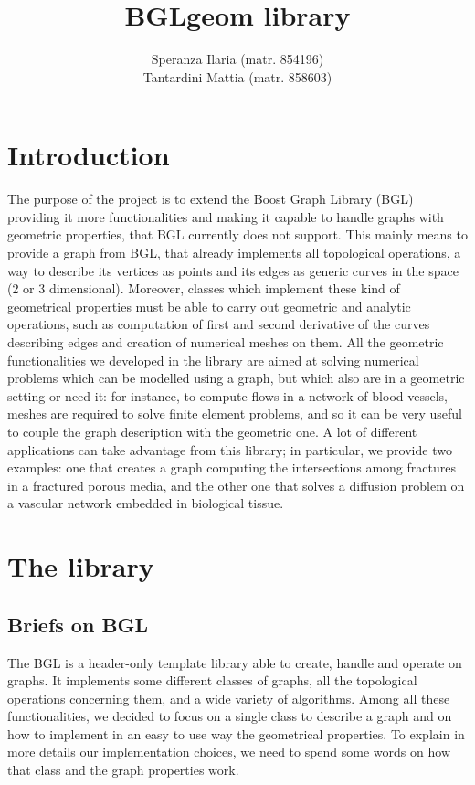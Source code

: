 \documentclass[10pt]{article} %
\title{BGLgeom library}
\author{Speranza Ilaria (matr. 854196) \\ Tantardini Mattia (matr. 858603)}
\begin{document}
	\maketitle
	\newpage
	\tableofcontents
	\newpage
	
	\section{Introduction}
	The purpose of the project is to extend the Boost Graph Library (BGL) providing it more functionalities and making it capable to handle graphs with geometric properties, that BGL currently does not support. This mainly means to provide a graph from BGL, that already implements all topological operations, a way to describe its vertices as points and its edges as generic curves in the space (2 or 3 dimensional). Moreover, classes which implement these kind of geometrical properties must be able to carry out geometric and analytic operations, such as computation of first and second derivative of the curves describing edges and creation of numerical meshes on them. \newline
	All the geometric functionalities we developed in the library are aimed at solving numerical problems which can be modelled using a graph, but which also are in a geometric setting or need it: for instance, to compute flows in a network of blood vessels, meshes are required to solve finite element problems, and so it can be very useful to couple the graph description with the geometric one. \newline
	A lot of different applications can take advantage from this library; in particular, we provide two examples: one that creates a graph computing the intersections among fractures in a fractured porous media, and the other one that solves a diffusion problem on a vascular network embedded in biological tissue.
	
	\section{The library}
	\subsection{Briefs on BGL}
	The BGL is a header-only template library able to create, handle and operate on graphs. It implements some different classes of graphs, all the topological operations concerning them, and a wide variety of algorithms.
	\newline\newline
	Among all these functionalities, we decided to focus on a single class to describe a graph and on how to implement in an easy to use way the geometrical properties. To explain in more details our implementation choices, we need to spend some words on how that class and the graph properties work.
	
\end{document}
